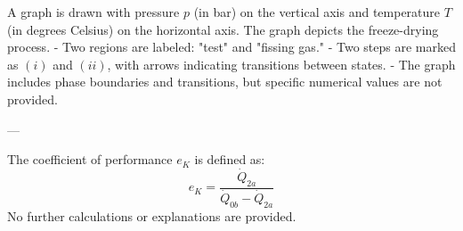 A graph is drawn with pressure \( p \) (in bar) on the vertical axis and temperature \( T \) (in degrees Celsius) on the horizontal axis. The graph depicts the freeze-drying process.  
- Two regions are labeled: "test" and "fissing gas."  
- Two steps are marked as \( (i) \) and \( (ii) \), with arrows indicating transitions between states.  
- The graph includes phase boundaries and transitions, but specific numerical values are not provided.

---

The coefficient of performance \( e_K \) is defined as:  
\[
e_K = \frac{\dot{Q}_{2a}}{\dot{Q}_{0b} - \dot{Q}_{2a}}
\]  
No further calculations or explanations are provided.